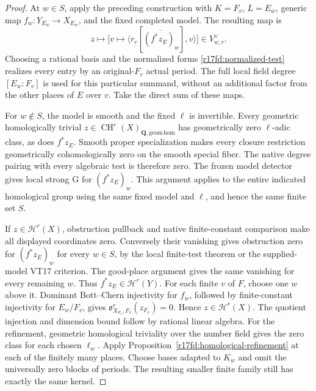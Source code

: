 \begin{proof}
At $w\in S$, apply the preceding construction with
$K=F_v$, $L=E_w$, generic map
$f_w:Y_{E_w}\to X_{E_w}$, and the fixed completed model.
The resulting map is
\[
   z\longmapsto
       \bigl[v\longmapsto
          \langle r_r[\overline{(f^*z_E)_w}],v\rangle\bigr]
          \in V_{w,r}^{\vee}.
\]
Choosing a rational basis and the normalized forms
\eqref{r17fd:normalized-test} realizes every entry by an
original-$F_v$ actual period. The full local field degree
$[E_w:F_v]$ is used for this particular summand, without
an additional factor from the other places of $E$ over $v$.
Take the direct sum of these maps.

For $w\notin S$, the model is smooth and the fixed $\ell$
is invertible. Every geometric homologically trivial
$z\in\operatorname{CH}^r(X)_{\mathbf Q,\mathrm{geom\,hom}}$
has geometrically zero $\ell$-adic class, as does $f^*z_E$.
Smooth proper specialization makes every closure restriction
geometrically cohomologically zero on the smooth special
fiber. The native degree pairing with every algebraic test
is therefore zero. The frozen model detector gives local
strong G for $(f^*z_E)_w$. This argument applies to the
entire indicated homological group using the same fixed
model and $\ell$, and hence the same finite set $S$.

If $z\in\mathcal H^r(X)$, obstruction pullback and native
finite-constant comparison make all displayed coordinates
zero. Conversely their vanishing gives obstruction zero
for $(f^*z_E)_w$ for every $w\in S$, by the local
finite-test theorem or the supplied-model VT17 criterion.
The good-place argument gives the same vanishing for every
remaining $w$. Thus $f^*z_E\in\mathcal H^r(Y)$.
For each finite $v$ of $F$, choose one $w$ above it.
Dominant Bott--Chern injectivity for $f_w$, followed by
finite-constant injectivity for $E_w/F_v$, gives
$\mathfrak o_{X_{F_v},F_v}^r(z_{F_v})=0$.
Hence $z\in\mathcal H^r(X)$. The quotient injection and
dimension bound follow by rational linear algebra.
For the refinement, geometric homological triviality over
the number field gives the zero class for each chosen
$\ell_w$. Apply Proposition~\ref{r17fd:homological-refinement}
at each of the finitely many places. Choose bases adapted
to $K_w$ and omit the universally zero blocks of periods.
The resulting smaller finite family still has exactly
the same kernel.
\end{proof}

